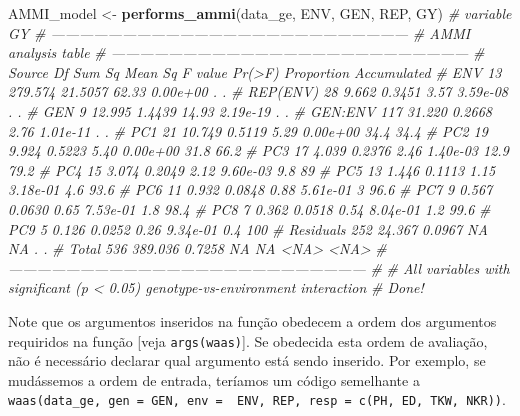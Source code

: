 \documentclass[
]{book}
\newenvironment{Shaded}{\begin{snugshade}}{\end{snugshade}}
\newcommand{\CommentTok}[1]{\textcolor[rgb]{0.56,0.35,0.01}{\textit{#1}}}
\newcommand{\KeywordTok}[1]{\textcolor[rgb]{0.13,0.29,0.53}{\textbf{#1}}}
\newcommand{\NormalTok}[1]{#1}
\newcommand{\StringTok}[1]{\textcolor[rgb]{0.31,0.60,0.02}{#1}}
\begin{document}
\begin{Shaded}
\begin{Highlighting}[]

\NormalTok{AMMI_model <-}\StringTok{ }\KeywordTok{performs_ammi}\NormalTok{(data_ge, ENV, GEN, REP, GY)}
\CommentTok{# variable GY }
\CommentTok{# ---------------------------------------------------------------------------}
\CommentTok{# AMMI analysis table}
\CommentTok{# ---------------------------------------------------------------------------}
\CommentTok{#     Source  Df  Sum Sq Mean Sq F value   Pr(>F) Proportion Accumulated}
\CommentTok{#        ENV  13 279.574 21.5057   62.33 0.00e+00          .           .}
\CommentTok{#   REP(ENV)  28   9.662  0.3451    3.57 3.59e-08          .           .}
\CommentTok{#        GEN   9  12.995  1.4439   14.93 2.19e-19          .           .}
\CommentTok{#    GEN:ENV 117  31.220  0.2668    2.76 1.01e-11          .           .}
\CommentTok{#        PC1  21  10.749  0.5119    5.29 0.00e+00       34.4        34.4}
\CommentTok{#        PC2  19   9.924  0.5223    5.40 0.00e+00       31.8        66.2}
\CommentTok{#        PC3  17   4.039  0.2376    2.46 1.40e-03       12.9        79.2}
\CommentTok{#        PC4  15   3.074  0.2049    2.12 9.60e-03        9.8          89}
\CommentTok{#        PC5  13   1.446  0.1113    1.15 3.18e-01        4.6        93.6}
\CommentTok{#        PC6  11   0.932  0.0848    0.88 5.61e-01          3        96.6}
\CommentTok{#        PC7   9   0.567  0.0630    0.65 7.53e-01        1.8        98.4}
\CommentTok{#        PC8   7   0.362  0.0518    0.54 8.04e-01        1.2        99.6}
\CommentTok{#        PC9   5   0.126  0.0252    0.26 9.34e-01        0.4         100}
\CommentTok{#  Residuals 252  24.367  0.0967      NA       NA          .           .}
\CommentTok{#      Total 536 389.036  0.7258      NA       NA       <NA>        <NA>}
\CommentTok{# ---------------------------------------------------------------------------}
\CommentTok{# }
\CommentTok{# All variables with significant (p < 0.05) genotype-vs-environment interaction}
\CommentTok{# Done!}
\end{Highlighting}
\end{Shaded}

\begin{dica}
Note que os argumentos inseridos na função obedecem a ordem dos argumentos requiridos na função {[}veja \texttt{args(waas)}{]}. Se obedecida esta ordem de avaliação, não é necessário declarar qual argumento está sendo inserido. Por exemplo, se mudássemos a ordem de entrada, teríamos um código semelhante a \texttt{waas(data\_ge,\ gen\ =\ GEN,\ env\ =\ \ ENV,\ REP,\ resp\ =\ c(PH,\ ED,\ TKW,\ NKR))}.
\end{dica}
\end{document}
